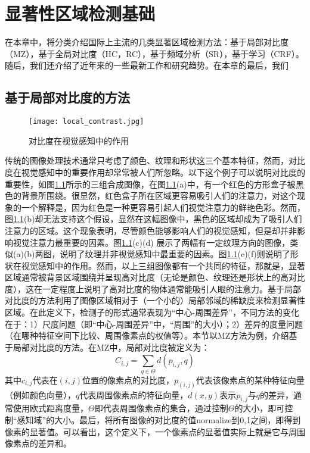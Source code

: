 
\chapter{显著性区域检测基础}
在本章中，将分类介绍国际上主流的几类显著区域检测方法：基于局部对比度（MZ\cite{ma2003contrast}），基于全局对比度（HC，RC\cite{cheng2011global}），基于频域分析（SR\cite{hou2007saliency}），基于学习（CRF\cite{maisaliency}）。随后，我们还介绍了近年来的一些最新工作和研究趋势。在本章的最后，我们

\section{基于局部对比度的方法}
\begin{figure}[h]
\centering
\texttt{[image: local\_contrast.jpg]}
\caption{对比度在视觉感知中的作用}\label{fig:local_contrast}
\end{figure}
传统的图像处理技术通常只考虑了颜色、纹理和形状这三个基本特征，然而，对比度在视觉感知中的重要作用却常常被人们所忽略。以下这个例子可以说明对比度的重要性\citep{ma2003contrast}，如图\ref{fig:local_contrast}所示的三组合成图像，在图\ref{fig:local_contrast}(a)中，有一个红色的方形盒子被黑色的背景所围绕。很显然，红色盒子所在区域更容易吸引人们的注意力，对这个现象的一个解释是，因为红色是一种更容易引起人们视觉注意力的鲜艳色彩。然而，图\ref{fig:local_contrast}(b)却无法支持这个假设，显然在这幅图像中，黑色的区域却成为了吸引人们注意力的区域。这个现象表明，尽管颜色能够影响人们的视觉感知，但是却并非影响视觉注意力最重要的因素。图\ref{fig:local_contrast}(c)(d) 展示了两幅有一定纹理方向的图像，类似(a)(b)两图，说明了纹理并非视觉感知中最重要的因素。图\ref{fig:local_contrast}(e)(f)则说明了形状在视觉感知中的作用。然而，以上三组图像都有一个共同的特征，那就是，显著区域通常被背景区域围绕并呈现高对比度（无论是颜色、纹理还是形状上的高对比度），这在一定程度上说明了高对比度的物体通常能吸引人眼的注意力。基于局部对比度的方法利用了图像区域相对于（一个小的）局部邻域的稀缺度来检测显著性区域。在此定义下，检测子的形式通常表现为“中心-周围差异”，不同方法的变化在于：1）尺度问题（即“中心-周围差异”中，“周围”的大小）；2）差异的度量问题（在哪种特征空间下比较、周围像素点的权值等）。本节以MZ\cite{ma2003contrast}方法为例，介绍基于局部对比度的方法。在MZ中，局部对比度被定义为：
\begin{equation}
C_{i,j} = \sum_{q \in \Theta}d(p_{i,j},q) \label{eq:local}
\end{equation}
其中$c_{i,j}$代表在$(i,j)$位置的像素点的对比度，$p_(i,j)$代表该像素点的某种特征向量（例如颜色向量），$q$代表周围像素点的特征向量，$d(x,y)$表示$p_{i,j}$与$q$的差异，通常使用欧式距离度量，$\Theta$即代表周围像素点的集合，通过控制$\Theta$的大小，即可控制“感知域”的大小。最后，将所有图像的对比度的值normalize到0,1之间，即得到像素的显著值。可以看出，这个定义下，一个像素点的显著值实际上就是它与周围像素点的差异和。

